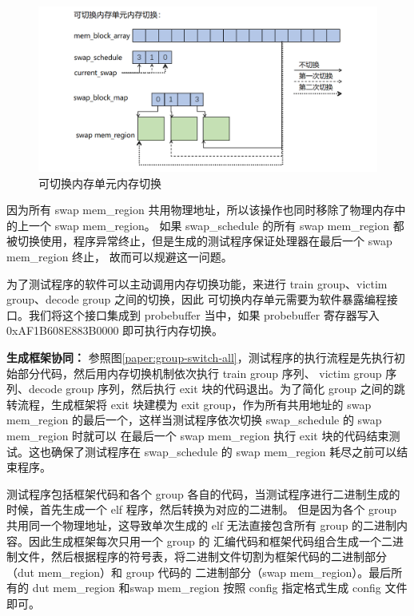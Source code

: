 \begin{figure}[!h]
    \centering
    \includegraphics[width=\linewidth]{figure/paper/swap-mem-swap.png}
    \caption{可切换内存单元内存切换}
    \label{paper:swap-mem-swap}
\end{figure}

因为所有 swap mem\_region 共用物理地址，所以该操作也同时移除了物理内存中的上一个 swap mem\_region。
如果 swap\_schedule 的所有 swap mem\_region 都被切换使用，程序异常终止，但是生成的测试程序保证处理器在最后一个 swap mem\_region 终止，
故而可以规避这一问题。\par

为了测试程序的软件可以主动调用内存切换功能，来进行 train group、victim group、decode group 之间的切换，因此
可切换内存单元需要为软件暴露编程接口。我们将这个接口集成到 probebuffer 当中，如果 probebuffer 寄存器写入 0xAF1B608E883B0000
即可执行内存切换。

\textbf{生成框架协同：}
参照图\ref{paper:group-switch-all}，测试程序的执行流程是先执行初始部分代码，然后用内存切换机制依次执行 train group 序列、
victim group 序列、decode group 序列，然后执行 exit 块的代码退出。为了简化 group 之间的跳转流程，生成框架将 exit 块建模为
 exit group，作为所有共用地址的 swap mem\_region 的最后一个，这样当测试程序依次切换 swap\_schedule 的 swap mem\_region 时就可以
在最后一个 swap mem\_region 执行 exit 块的代码结束测试。这也确保了测试程序在 swap\_schedule 的 swap mem\_region 耗尽之前可以结束程序。\par

测试程序包括框架代码和各个 group 各自的代码，当测试程序进行二进制生成的时候，首先生成一个 elf 程序，然后转换为对应的二进制。
但是因为各个 group 共用同一个物理地址，这导致单次生成的 elf 无法直接包含所有 group 的二进制内容。因此生成框架每次只用一个 group 的
汇编代码和框架代码组合生成一个二进制文件，然后根据程序的符号表，将二进制文件切割为框架代码的二进制部分（dut mem\_region）和 group 代码的
二进制部分（swap mem\_region）。最后所有的 dut mem\_region 和swap mem\_region 按照 config 指定格式生成 config 文件即可。\par

